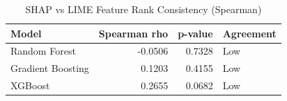 \begin{table}
\caption{SHAP vs LIME Feature Rank Consistency (Spearman)}
\label{tab:shap_lime}
\begin{tabular}{lrrl}
\toprule
Model & Spearman rho & p-value & Agreement \\
\midrule
Random Forest & -0.0506 & 0.7328 & Low \\
Gradient Boosting & 0.1203 & 0.4155 & Low \\
XGBoost & 0.2655 & 0.0682 & Low \\
\bottomrule
\end{tabular}
\end{table}
